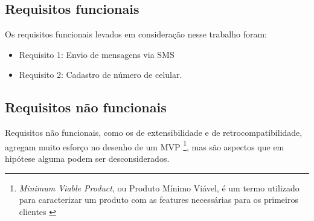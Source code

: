 \subsection{Requisitos funcionais}
\label{reqFuncionais}

Os requisitos funcionais levados em consideração nesse trabalho foram:

\begin{itemize}
	\item Requisito 1: Envio de mensagens via SMS \cite{SMS}
	
	\item Requisito 2: Cadastro de número de celular.
\end{itemize}

\subsection{Requisitos não funcionais}
\label{reqNaoFuncionais}

Requisitos não funcionais, como os de extensibilidade e de retrocompatibilidade, agregam muito esforço no desenho de um MVP \footnote{\textit{Minimum Viable Product}, ou Produto Mínimo Viável, é um termo utilizado para caracterizar um produto com as features necessárias para os primeiros clientes \cite{MVP}}, mas são aspectos que em hipótese alguma podem ser desconsiderados.